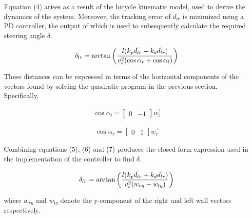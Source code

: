 \documentclass[conference]{IEEEtran}
\begin{document}
Equation (4) arises as a result of the bicycle kinematic model, used to derive the dynamics of the system. Moreover, the tracking error of $d_{lr}$ is minimized using a PD controller, the output of which is used to subsequently calculate the required steering angle $\delta$. 

\begin{equation}
        \delta_{lr} = \arctan \left( \frac{l ( k_p \Tilde{d_{lr}} +k_d \dot{d_{lr}} )}{v_s^2(\cos \alpha_{r} + \cos \alpha_{l} )} \right) 
\end{equation}




These distances can be expressed in terms of the horizontal components of the vectors found by solving the quadratic program in the previous section. Specifically, 


\begin{equation}
    \begin{aligned}
        \cos \alpha_l = \begin{bmatrix}
            0 & -1
        \end{bmatrix} \Vec{w_l} 
    \end{aligned}
\end{equation}

\begin{equation}
    \begin{aligned}
         \cos \alpha_r = \begin{bmatrix}
            0 & 1
        \end{bmatrix} \Vec{w_r}
    \end{aligned}
\end{equation}


Combining equations (5), (6) and (7) produces the closed form expression used in the implementation of the controller to find $\delta$.

\begin{equation}
    \begin{aligned}
        \delta_{lr} = \arctan \left( \frac{l(k_p \Tilde{d_{lr}}+ k_d \dot{d_{lr}})}{v_s^2(w_{ry} - w_{ly})} \right)
    \end{aligned}
\end{equation}

where $w_{ry}$ and $w_{ly}$ denote the y-component of the right and left wall vectors respectively.  



\end{document}
